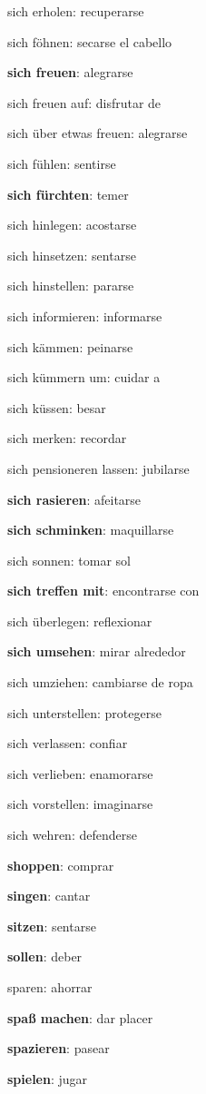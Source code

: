 \begin{multicols}{2}
\begin{myitemize}
\item sich erholen: recuperarse
\item sich föhnen: secarse el cabello
\item \textbf{sich freuen}: alegrarse
\item sich freuen auf: disfrutar de
\item sich über etwas freuen: alegrarse
\item sich fühlen: sentirse
\item \textbf{sich fürchten}: temer
\item sich hinlegen: acostarse
\item sich hinsetzen: sentarse
\item sich hinstellen: pararse
\item sich informieren: informarse
\item sich kämmen: peinarse
\item sich kümmern um: cuidar a
\item sich küssen: besar
\item sich merken: recordar
\item sich pensioneren lassen: jubilarse
\item \textbf{sich rasieren}: afeitarse
\item \textbf{sich schminken}: maquillarse
\item sich sonnen: tomar sol
\item \textbf{sich treffen mit}: encontrarse con
\item sich überlegen: reflexionar
\item \textbf{sich umsehen}: mirar alrededor
\item sich umziehen: cambiarse de ropa
\item sich unterstellen: protegerse
\item sich verlassen: confiar
\item sich verlieben: enamorarse
\item sich vorstellen: imaginarse
\item sich wehren: defenderse
\item \textbf{shoppen}: comprar
\item \textbf{singen}: cantar
\item \textbf{sitzen}: sentarse
\item \textbf{sollen}: deber
\item sparen: ahorrar
\item \textbf{spaß machen}: dar placer
\item \textbf{spazieren}: pasear
\item \textbf{spielen}: jugar

\end{myitemize}
\end{multicols}
